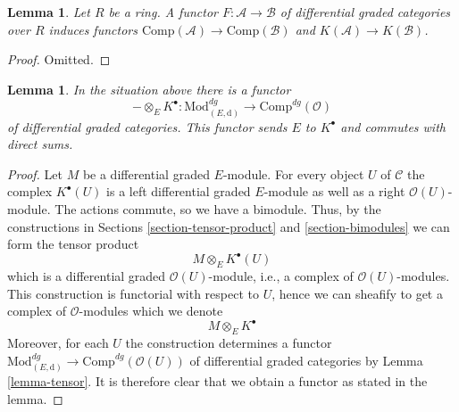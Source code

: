 \documentclass{stacks-project}
\theoremstyle{plain}
\newtheorem{lemma}[subsection]{Lemma}
\theoremstyle{definition}
\theoremstyle{remark}
\numberwithin{equation}{subsection}
\begin{document}
\begin{lemma}
\label{lemma-functorial}
Let $R$ be a ring. A functor $F : \mathcal{A} \to \mathcal{B}$
of differential graded categories over $R$ induces functors
$\text{Comp}(\mathcal{A}) \to \text{Comp}(\mathcal{B})$
and $K(\mathcal{A}) \to K(\mathcal{B})$.
\end{lemma}

\begin{proof}
Omitted.
\end{proof}

\begin{lemma}
\label{lemma-tensor-with-complex}
In the situation above there is a functor
$$
- \otimes_E K^\bullet :
\text{Mod}^{dg}_{(E, \text{d})}
\longrightarrow
\text{Comp}^{dg}(\mathcal{O})
$$
of differential graded categories. This functor sends $E$ to $K^\bullet$
and commutes with direct sums.
\end{lemma}

\begin{proof}
Let $M$ be a differential graded $E$-module. For every object $U$ of
$\mathcal{C}$ the complex $K^\bullet(U)$ is a left differential
graded $E$-module as well as a right $\mathcal{O}(U)$-module.
The actions commute, so we have a bimodule.
Thus, by the constructions in
Sections \ref{section-tensor-product} and \ref{section-bimodules}
we can form the tensor product
$$
M \otimes_E K^\bullet(U)
$$
which is a differential graded $\mathcal{O}(U)$-module, i.e., a complex
of $\mathcal{O}(U)$-modules. This construction is functorial with respect
to $U$, hence we can sheafify to get a complex of $\mathcal{O}$-modules
which we denote
$$
M \otimes_E K^\bullet
$$
Moreover, for each $U$ the construction determines a functor
$\text{Mod}^{dg}_{(E, \text{d})} \to \text{Comp}^{dg}(\mathcal{O}(U))$
of differential graded categories by Lemma \ref{lemma-tensor}.
It is therefore clear that we obtain a functor as stated in the lemma.
\end{proof}
\end{document}
